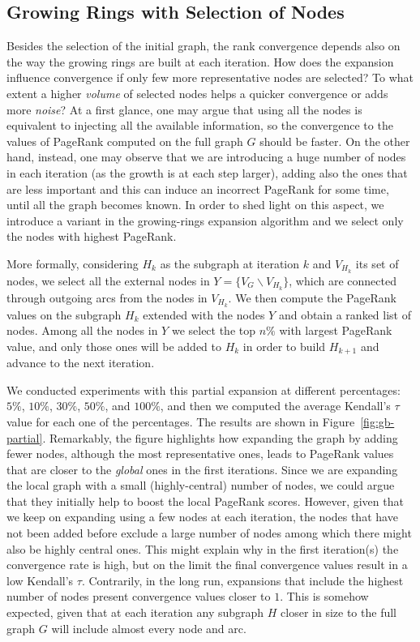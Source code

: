 \documentclass{sig-alternate-2013}
\begin{document}
\subsection{Growing Rings with Selection of Nodes}
% 
Besides the selection of the initial graph, the rank convergence depends also on
the way the growing rings are built at each iteration. How does the expansion
influence convergence if only few more representative nodes are selected? To
what extent a higher \textit{volume} of selected nodes helps a quicker
convergence or adds more {\it noise}? At a first glance, one may argue that
using all the nodes is equivalent to injecting all the available information, so the
convergence to the values of PageRank computed on the full graph $G$ should be
faster. On the other hand, instead, one may observe that we are introducing a
huge number of nodes in each iteration (as the growth is at each step larger),
adding also the ones that are less important and this can induce an incorrect
PageRank for some time, until all the graph becomes known.
In order to shed light on this aspect, we introduce a variant in the
growing-rings expansion algorithm and we select only the nodes with highest
PageRank. 

More formally, considering $H_k$ as the subgraph at iteration $k$ and $V_{H_k}$
its set of nodes, we select all the external nodes in $Y = \{V_G \backslash V_{H_k}\}$,
which are connected through outgoing arcs from the nodes in $V_{H_k}$.
We then compute the PageRank values on the subgraph $H_k$ extended with the
nodes $Y$ and obtain a ranked list of nodes. Among all the nodes in $Y$ we
select the top $n\%$ with largest PageRank value, and only those ones will be
added to $H_k$ in order to build $H_{k+1}$ and advance to the next iteration.

We conducted experiments with this partial expansion at different percentages:
$5\%$, $10\%$, $30\%$, $50\%$, and $100\%$, and then we computed the
average Kendall's $\tau$ value for each one of the percentages. The results are 
shown in Figure~\ref{fig:gb-partial}. Remarkably,
the figure highlights how expanding the graph by adding fewer nodes, although
the most representative ones, leads to PageRank values that are closer to the
\emph{global} ones in the first iterations. Since we are expanding the local
graph with a small (highly-central) number of nodes, we could argue that they
initially help to boost the local PageRank scores. However, given that we keep
on expanding using a few nodes at each iteration, the nodes that have not been
added before exclude a large number of nodes among which there might also be
highly central ones. This might explain why in the first iteration(s) the
convergence rate is high, but on the limit the final convergence values result in a
low Kendall's $\tau$.
Contrarily, in the long run, expansions that include the highest number of nodes
present convergence values closer to $1$. This is somehow expected, given that
at each iteration any subgraph $H$ closer in size to the full graph $G$ will
include almost every node and arc. 
\end{document}
